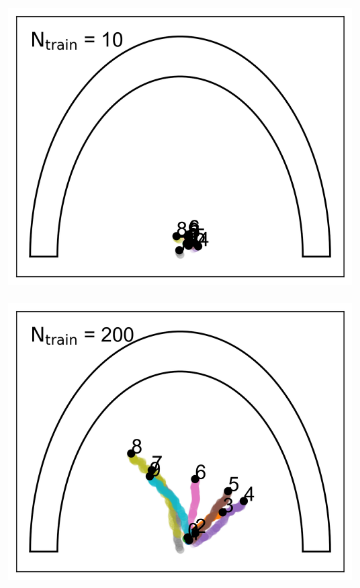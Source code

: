 \documentclass[aps,prb,twocolumn,superscriptaddress,floatfix,longbibliography]{revtex4-2}
\begin{document}
\begin{figure}
  \centering
  \begin{subfigure}[b]{0.24\textwidth}
      \centering
      \includegraphics[width=\textwidth]{ej2_fig3_1.png}
      \caption{\label{fig:ej2_fig3_1}}
  \end{subfigure}
  \hfill
  \begin{subfigure}[b]{0.24\textwidth}
      \centering
      \includegraphics[width=\textwidth]{ej2_fig3_2.png}
      \caption{\label{fig:ej2_fig3_2}}
  \end{subfigure}
  \hfill
  \begin{subfigure}[b]{0.24\textwidth}

\end{subfigure}
\end{figure}
\end{document}
